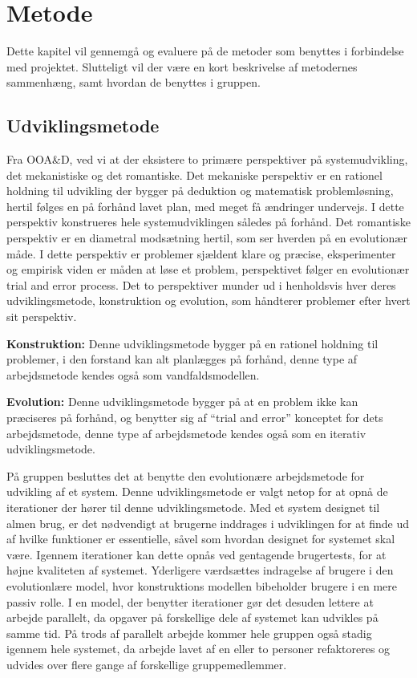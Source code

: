 \chapter{Metode}\label{chapter:Metode}

Dette kapitel vil gennemgå og evaluere på de metoder som benyttes i forbindelse med projektet.
Slutteligt vil der være en kort beskrivelse af metodernes sammenhæng, samt hvordan de benyttes i gruppen.

\section{Udviklingsmetode}\label{s:udviklingsmetode}
Fra OOA\&D, ved vi at der eksistere to primære perspektiver på systemudvikling, det mekanistiske og det romantiske.
Det mekaniske perspektiv er en rationel holdning til udvikling der bygger på deduktion og matematisk problemløsning, hertil følges en på forhånd lavet plan, med meget få ændringer undervejs.
I dette perspektiv konstrueres hele systemudviklingen således på forhånd.
Det romantiske perspektiv er en diametral modsætning hertil, som ser hverden på en evolutionær måde.
I dette perspektiv er problemer sjældent klare og præcise, eksperimenter og empirisk viden er måden at løse et problem, perspektivet følger en evolutionær trial and error process.
Det to perspektiver munder ud i henholdsvis hver deres udviklingsmetode, konstruktion og evolution, som håndterer problemer efter hvert sit perspektiv.\citep{OOA&D2001}

\textbf{Konstruktion:}
Denne udviklingsmetode bygger på en rationel holdning til problemer, i den forstand kan alt planlægges på forhånd, denne type af arbejdsmetode kendes også som vandfaldsmodellen.

\textbf{Evolution:}
Denne udviklingsmetode bygger på at en problem ikke kan præciseres på forhånd, og benytter sig af ``trial and error'' konceptet for dets arbejdsmetode, denne type af arbejdsmetode kendes også som en iterativ udviklingsmetode.

På gruppen besluttes det at benytte den evolutionære arbejdsmetode for udvikling af et system. 
Denne udviklingsmetode er valgt netop for at opnå de iterationer der hører til denne udviklingsmetode. 
Med et system designet til almen brug, er det nødvendigt at brugerne inddrages i udviklingen for at finde ud af hvilke funktioner er essentielle, såvel som hvordan designet for systemet skal være. 
Igennem iterationer kan dette opnås ved gentagende brugertests, for at højne kvaliteten af systemet. 
Yderligere værdsættes indragelse af brugere i den evolutionlære model, hvor konstruktions modellen bibeholder brugere i en mere passiv rolle.
I en model, der benytter iterationer gør det desuden lettere at arbejde parallelt, da opgaver på forskellige dele af systemet kan udvikles på samme tid.
På trods af parallelt arbejde kommer hele gruppen også stadig igennem hele systemet, da arbejde lavet af en eller to personer refaktoreres og udvides over flere gange af forskellige gruppemedlemmer.

